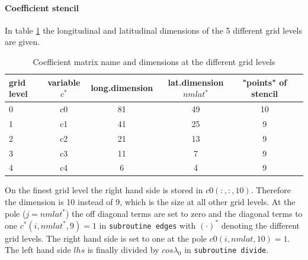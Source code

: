 \paragraph{Coefficient stencil}
In table \ref{tab:c_level} the longitudinal and latitudinal dimensions 
of the 5 different grid levels are given. 
%
\begin{table}[tb]
\begin{tabular}{|p{1.5cm} ||c|c|c|c|c|} \hline
grid level   & variable $c^*$ & long.dimension& lat.dimension $nmlat^*$ & "points" of stencil\\ \hline \hline
%
0 &c0 & 81& 49& 10\\ 
1 &c1 & 41& 25& 9 \\ 
2 &c2 & 21& 13& 9 \\ 
3 &c3 & 11&  7& 9 \\ 
4 &c4 & 6 &  4& 9 \\ \hline
%
\end{tabular}
\caption{Coefficient matrix name and dimensions at the different grid levels}
\label{tab:c_level}
\end{table} 
%
On the finest grid level the right hand side is stored in $c0(:,:,10)$.
Therefore the dimension is 10 instead of 9, which is the size at all other grid
levels. At the pole ($j=nmlat^*$) the off diagonal terms are set to zero and the diagonal
terms to one $c^*(i,nmlat^*,9)=1$ in \texttt{subroutine edges} with $(\cdot)^*$ denoting the different grid
levels. The right hand side is set to one at the
pole  $c0(i,nmlat,10)=1$. The left hand side $lhs$ is finally divided 
by $cos \lambda_0$ in \texttt{subroutine divide}.
